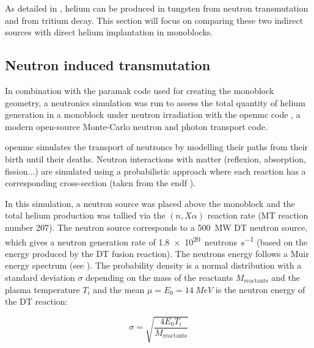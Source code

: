 As detailed in , helium can be produced in tungsten from neutron \gls{transmutation} and from tritium decay.
This section will focus on comparing these two indirect sources with direct helium implantation in \glspl{monoblock}.

\subsection{Neutron induced transmutation}

In combination with the \gls{paramak} code  used for creating the \gls{monoblock} geometry, a neutronics simulation was run to assess the total quantity of helium generation in a \gls{monoblock} under neutron irradiation with the \gls{openmc} code , a modern open-source Monte-Carlo neutron and photon transport code.

\Gls{openmc} simulates the transport of neutroncs by modelling their paths from their birth until their deaths.
Neutron interactions with matter (reflexion, absorption, fission...) are simulated using a probabilistic approach where each reaction has a corresponding cross-section (taken from the \gls{endf} ).

In this simulation, a neutron source was placed above the \gls{monoblock} and the total helium production was tallied via the $(n,X\alpha)$ reaction rate (MT reaction number 207).
The neutron source corresponds to a \SI{500}{MW} DT neutron source, which gives a neutron generation rate of \SI{1.8e20}{neutrons.s^{-1}} (based on the energy produced by the DT fusion reaction).
The neutrons energy follows a Muir energy spectrum  (see ).
The probability density is a normal distribution with a standard deviation $\sigma$ depending on the mass of the reactants $M_\mathrm{reactants}$ and the \gls{plasma} temperature $T_i$ and the mean $\mu=E_0= \SI{14}{MeV}$ is the neutron energy of the DT reaction:

\begin{equation}
    \sigma = \sqrt{\frac{4 E_0 T_i}{M_\mathrm{reactants}}}
\end{equation}

